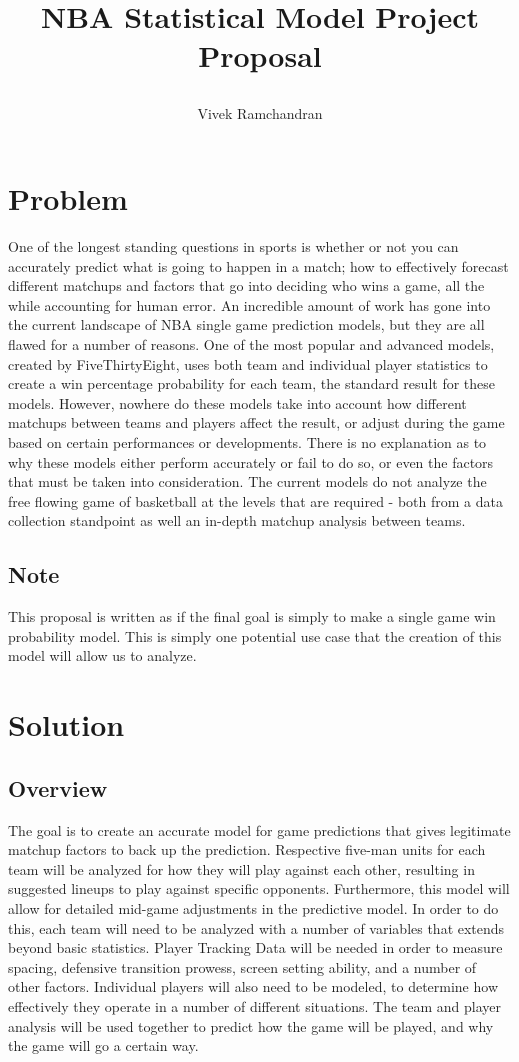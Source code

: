 \documentclass{article}
\title{ \begin{huge}
\textbf{NBA Statistical Model Project Proposal} 
\end{huge} }
\author{Vivek Ramchandran}
\begin{document}
\maketitle

\section*{Problem}
One of the longest standing questions in sports is whether or not you can accurately predict what is going to happen in a match; how to effectively forecast different matchups and factors that go into deciding who wins a game, all the while accounting for human error.  An incredible amount of work has gone into the current landscape of NBA single game prediction models, but they are all flawed for a number of reasons.  One of the most popular and advanced models, created by FiveThirtyEight, uses both team and individual player statistics to create a win percentage probability for each team, the standard result for these models.  However, nowhere do these models take into account how different matchups between teams and players affect the result, or adjust during the game based on certain performances or developments.  There is no explanation as to why these models either perform accurately or fail to do so, or even the factors that must be taken into consideration.  The current models do not analyze the free flowing game of basketball at the levels that are required - both from a data collection standpoint as well an in-depth matchup analysis between teams.

\subsection*{Note}
This proposal is written as if the final goal is simply to make a single game win probability model.  This is simply one potential use case that the creation of this model will allow us to analyze.

\section*{Solution}

\subsection*{Overview}
The goal is to create an accurate model for game predictions that gives legitimate matchup factors to back up the prediction.  Respective five-man units for each team will be analyzed for how they will play against each other, resulting in suggested lineups to play against specific opponents.  Furthermore, this model will allow for detailed mid-game adjustments in the predictive model.
	In order to do this, each team will need to be analyzed with a number of variables that extends beyond basic statistics.  Player Tracking Data will be needed in order to measure spacing, defensive transition prowess, screen setting ability, and a number of other factors.  Individual players will also need to be modeled, to determine how effectively they operate in a number of different situations.  The team and player analysis will be used together to predict how the game will be played, and why the game will go a certain way.
\end{document}
